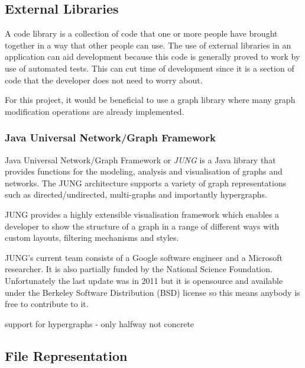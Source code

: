 \subsection{External Libraries}
  A code library is a collection of code that one or more people have brought together in a way that other people can use. The use of external libraries in an application can aid development because this code is generally proved to work by use of automated tests. This can cut time of development since it is a section of code that the developer does not need to worry about.

  For this project, it would be beneficial to use a graph library where many graph modification operations are already implemented.

  \subsubsection{Java Universal Network/Graph Framework}
  Java Universal Network/Graph Framework or \emph{JUNG} is a Java library that provides functions for the modeling, analysis and visualisation of graphs and networks. The JUNG architecture supports a variety of graph representations such as directed/undirected, multi-graphs and importantly hypergraphs.

  JUNG provides a highly extensible visualisation framework which enables a developer to show the structure of a graph in a range of different ways with custom layouts, filtering mechanisms and styles.

  JUNG's current team consists of a Google software engineer and a Microsoft researcher. It is also partially funded by the National Science Foundation. Unfortunately the last update was in 2011 but it is opensource and available under the Berkeley Software Distribution (BSD) license so this means anybody is free to contribute to it.


  support for hypergraphs - only halfway not concrete

\subsection{File Representation}
